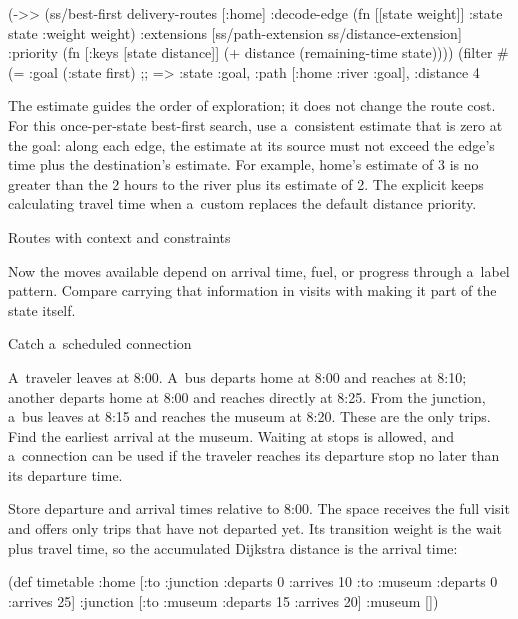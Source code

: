 {{{(->> (ss/best-first delivery-routes [:home]
                        {:decode-edge (fn [[state weight]]
                                        {:state state :weight weight})
                         :extensions [ss/path-extension
                                      ss/distance-extension]
                         :priority (fn [{:keys [state distance]}]
                                     (+ distance
                                        (remaining-time state)))})
     (filter #(= :goal (:state %
     first)
;; => {:state :goal, :path [:home :river :goal], :distance 4}
\endtt

The estimate guides the order of exploration; it does not change the route
cost. For this once-per-state best-first search, use a~consistent estimate
that is zero at the goal: along each edge, the estimate at its source must
not exceed the edge's time plus the destination's estimate. For example,
home's estimate of 3 is no greater than the 2 hours to the river plus its
estimate of 2. The explicit  keeps calculating
travel time when a~custom  replaces the default distance
priority.

\sec Routes with context and constraints

Now the moves available depend on arrival time, fuel, or progress through
a~label pattern. Compare carrying that information in visits with making it
part of the state itself.

 Catch a~scheduled connection

 A~traveler leaves  at 8:00. A~bus
departs home at 8:00 and reaches  at 8:10; another departs
home at 8:00 and reaches  directly at 8:25. From the
junction, a~bus leaves at 8:15 and reaches the museum at 8:20. These are
the only trips. Find the earliest arrival at the museum. Waiting at stops
is allowed, and a~connection can be used if the traveler reaches its
departure stop no later than its departure time.

\smallskip
{} Store departure and arrival times relative to 8:00.
The space receives the full visit and offers only trips that have not
departed yet. Its transition weight is the wait plus travel time, so the
accumulated Dijkstra distance is the arrival time:

\begtt {}
(def timetable
  {:home [{:to :junction :departs 0 :arrives 10}
          {:to :museum :departs 0 :arrives 25}]
   :junction [{:to :museum :departs 15 :arrives 20}]
   :museum []})

}}}
